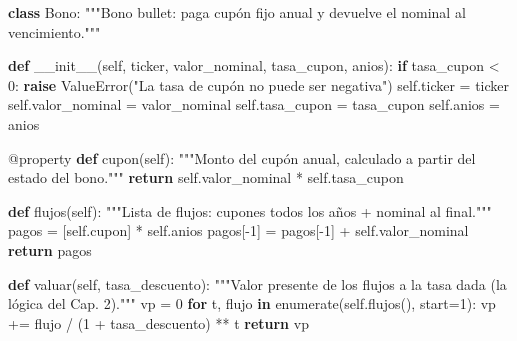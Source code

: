 \documentclass[
  spanish,
  letterpaper,
  DIV=11,
  numbers=noendperiod]{scrreprt}
\newenvironment{Shaded}{\begin{snugshade}}{\end{snugshade}}
\newcommand{\AttributeTok}[1]{\textcolor[rgb]{0.40,0.45,0.13}{#1}}
\newcommand{\BuiltInTok}[1]{\textcolor[rgb]{0.00,0.23,0.31}{#1}}
\newcommand{\CommentTok}[1]{\textcolor[rgb]{0.37,0.37,0.37}{#1}}
\newcommand{\ControlFlowTok}[1]{\textcolor[rgb]{0.00,0.23,0.31}{\textbf{#1}}}
\newcommand{\DecValTok}[1]{\textcolor[rgb]{0.68,0.00,0.00}{#1}}
\newcommand{\FunctionTok}[1]{\textcolor[rgb]{0.28,0.35,0.67}{#1}}
\newcommand{\KeywordTok}[1]{\textcolor[rgb]{0.00,0.23,0.31}{\textbf{#1}}}
\newcommand{\NormalTok}[1]{\textcolor[rgb]{0.00,0.23,0.31}{#1}}
\newcommand{\OperatorTok}[1]{\textcolor[rgb]{0.37,0.37,0.37}{#1}}
\newcommand{\PreprocessorTok}[1]{\textcolor[rgb]{0.68,0.00,0.00}{#1}}
\newcommand{\StringTok}[1]{\textcolor[rgb]{0.13,0.47,0.30}{#1}}
\newcommand{\VariableTok}[1]{\textcolor[rgb]{0.07,0.07,0.07}{#1}}
\begin{document}
\label{clase-bono}
\begin{Shaded}
\begin{Highlighting}[]
\KeywordTok{class}\NormalTok{ Bono:}
    \CommentTok{"""Bono bullet: paga cupón fijo anual y devuelve el nominal al vencimiento."""}

    \KeywordTok{def} \FunctionTok{\_\_init\_\_}\NormalTok{(}\VariableTok{self}\NormalTok{, ticker, valor\_nominal, tasa\_cupon, anios):}
        \ControlFlowTok{if}\NormalTok{ tasa\_cupon }\OperatorTok{\textless{}} \DecValTok{0}\NormalTok{:}
            \ControlFlowTok{raise} \PreprocessorTok{ValueError}\NormalTok{(}\StringTok{"La tasa de cupón no puede ser negativa"}\NormalTok{)}
        \VariableTok{self}\NormalTok{.ticker }\OperatorTok{=}\NormalTok{ ticker}
        \VariableTok{self}\NormalTok{.valor\_nominal }\OperatorTok{=}\NormalTok{ valor\_nominal}
        \VariableTok{self}\NormalTok{.tasa\_cupon }\OperatorTok{=}\NormalTok{ tasa\_cupon}
        \VariableTok{self}\NormalTok{.anios }\OperatorTok{=}\NormalTok{ anios}

    \AttributeTok{@property}
    \KeywordTok{def}\NormalTok{ cupon(}\VariableTok{self}\NormalTok{):}
        \CommentTok{"""Monto del cupón anual, calculado a partir del estado del bono."""}
        \ControlFlowTok{return} \VariableTok{self}\NormalTok{.valor\_nominal }\OperatorTok{*} \VariableTok{self}\NormalTok{.tasa\_cupon}

    \KeywordTok{def}\NormalTok{ flujos(}\VariableTok{self}\NormalTok{):}
        \CommentTok{"""Lista de flujos: cupones todos los años + nominal al final."""}
\NormalTok{        pagos }\OperatorTok{=}\NormalTok{ [}\VariableTok{self}\NormalTok{.cupon] }\OperatorTok{*} \VariableTok{self}\NormalTok{.anios}
\NormalTok{        pagos[}\OperatorTok{{-}}\DecValTok{1}\NormalTok{] }\OperatorTok{=}\NormalTok{ pagos[}\OperatorTok{{-}}\DecValTok{1}\NormalTok{] }\OperatorTok{+} \VariableTok{self}\NormalTok{.valor\_nominal}
        \ControlFlowTok{return}\NormalTok{ pagos}

    \KeywordTok{def}\NormalTok{ valuar(}\VariableTok{self}\NormalTok{, tasa\_descuento):}
        \CommentTok{"""Valor presente de los flujos a la tasa dada (la lógica del Cap. 2)."""}
\NormalTok{        vp }\OperatorTok{=} \DecValTok{0}
        \ControlFlowTok{for}\NormalTok{ t, flujo }\KeywordTok{in} \BuiltInTok{enumerate}\NormalTok{(}\VariableTok{self}\NormalTok{.flujos(), start}\OperatorTok{=}\DecValTok{1}\NormalTok{):}
\NormalTok{            vp }\OperatorTok{+=}\NormalTok{ flujo }\OperatorTok{/}\NormalTok{ (}\DecValTok{1} \OperatorTok{+}\NormalTok{ tasa\_descuento) }\OperatorTok{**}\NormalTok{ t}
        \ControlFlowTok{return}\NormalTok{ vp}


\end{Highlighting}
\end{Shaded}
\end{document}
